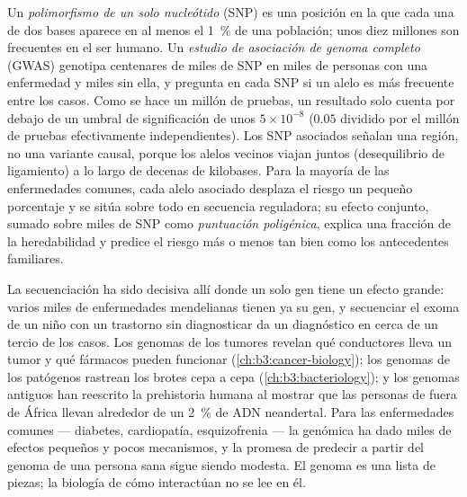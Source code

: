 \begin{definition}\label{def:b3:genomics:gwas}
Un \emph{polimorfismo de un solo nucleótido} (SNP) es una posición en la
que cada una de dos bases aparece en al menos el \qty{1}{\%} de una
población; unos diez millones son frecuentes en el ser humano. Un
\emph{estudio de asociación de genoma completo} (GWAS) genotipa
centenares de miles de SNP en miles de personas con una enfermedad y
miles sin ella, y pregunta en cada SNP si un alelo es más frecuente entre
los casos. Como se hace un millón de pruebas, un resultado solo cuenta
por debajo de un umbral de significación de unos $5\times 10^{-8}$
($0.05$ dividido por el millón de pruebas efectivamente independientes).
Los SNP asociados señalan una región, no una variante causal, porque los
alelos vecinos viajan juntos (desequilibrio de ligamiento) a lo largo de
decenas de kilobases. Para la mayoría de las enfermedades comunes, cada
alelo asociado desplaza el riesgo un pequeño porcentaje y se sitúa sobre
todo en secuencia reguladora; su efecto conjunto, sumado sobre miles de
SNP como \emph{puntuación poligénica}, explica una fracción de la
heredabilidad y predice el riesgo más o menos tan bien como los
antecedentes familiares.
\end{definition}

\begin{remark}\label{rem:b3:genomics:delivered}
La secuenciación ha sido decisiva allí donde un solo gen tiene un efecto
grande: varios miles de enfermedades mendelianas tienen ya su gen, y
secuenciar el exoma de un niño con un trastorno sin diagnosticar da un
diagnóstico en cerca de un tercio de los casos. Los genomas de los
tumores revelan qué conductores lleva un tumor y qué fármacos pueden
funcionar (\cref{ch:b3:cancer-biology}); los genomas de los patógenos
rastrean los brotes cepa a cepa (\cref{ch:b3:bacteriology}); y los
genomas antiguos han reescrito la prehistoria humana al mostrar que las
personas de fuera de África llevan alrededor de un \qty{2}{\%} de ADN
neandertal. Para las enfermedades comunes --- diabetes, cardiopatía,
esquizofrenia --- la genómica ha dado miles de efectos pequeños y pocos
mecanismos, y la promesa de predecir a partir del genoma de una persona
sana sigue siendo modesta. El genoma es una lista de piezas; la biología
de cómo interactúan no se lee en él.
\end{remark}

